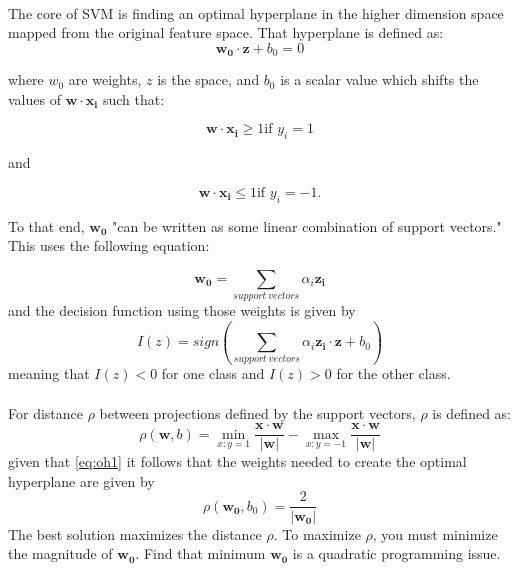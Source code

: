 			\paragraph{} The core of SVM is finding an optimal hyperplane in the higher dimension space mapped from the original feature space.  That hyperplane is defined as:
			\begin{equation}\label{eq:oh1} \mathbf{w_0} \cdot \mathbf{z} + b_0 = 0\end{equation} 
			
			where $w_0$ are weights, $z$ is the space, and $b_0$ is a scalar value which shifts the values of $\mathbf{w\cdot x_i}$ such that:
			
			\begin{equation} \label{eq:b-not_one} \mathbf{w\cdot x_i} \ge 1 \text{if }y_i = 1 \end{equation}
			
			and
			
			\begin{equation} \label{eq:b-not_two} \mathbf{w\cdot x_i} \le 1 \text{if }y_i = -1 .\end{equation}
			
			To that end, $\mathbf{w_0}$ "can be written as some linear combination of support vectors."  This uses the following equation:
			
			\begin{equation}\mathbf{w_0} = \sum_{support\ vectors} \alpha_i \mathbf{z_i}\end{equation} and the decision function using those weights is given by
			\begin{equation}I(z) = sign\left(\sum_{support\ vectors} \alpha_i \mathbf{z_i} \cdot \mathbf{z} + b_0\right)\end{equation}
			meaning that $I(z) < 0$ for one class and $I(z) > 0$ for the other class.
			\paragraph{}
			For distance $\rho$ between projections defined by the support vectors, $\rho$ is defined as:
			\begin{equation}\rho(\mathbf{w}, b) = \min_{x:y=1} \frac{\mathbf{x} \cdot \mathbf{w}}{ |\mathbf{w}|} - \max_{x:y=-1} \frac{\mathbf{x} \cdot \mathbf{w}}{|\mathbf{w}|}\end{equation}
			given that \ref{eq:oh1} it follows that the weights needed to create the optimal hyperplane are given by
			\begin{equation} \rho (\mathbf{w_0}, b_0) = \frac{2}{|\mathbf{w_0}|}\end{equation}  The best solution maximizes the distance $\rho$.  To maximize $\rho$, you must minimize the magnitude of $\mathbf{w_0}$.  Find that minimum $\mathbf{w_0}$ is a quadratic programming issue.\cite{vapnik_support-vector_1995}

